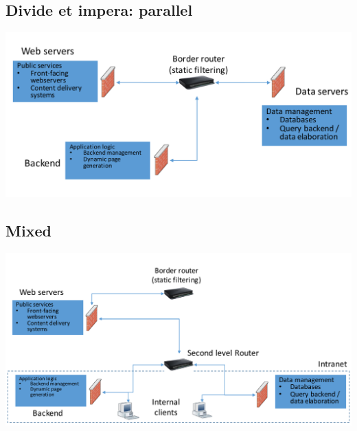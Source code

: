 \documentclass[10pt,a4paper]{book}
\begin{document}
\subsection{Divide et impera: parallel}
\includegraphics[scale=0.3]{firewall/parallel.png}
\subsection{Mixed}
\includegraphics[scale=0.3]{firewall/mixed.png}
\end{document}
